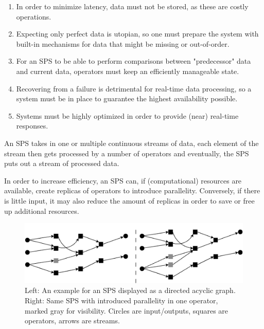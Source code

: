         \begin{enumerate}
            \item {} 
                In order to minimize latency, data must not be stored, as these are costly operations.
            \item {} 
                Expecting only perfect data is utopian, so one must prepare the system with built-in mechanisms for data that might be missing or out-of-order.
            \item {} 
                For an SPS to be able to perform comparisons between "predecessor" data and current data, operators must keep an efficiently manageable state.
            \item {} 
                Recovering from a failure is detrimental for real-time data processing, so a system must be in place to guarantee the highest availability possible.
            \item {} Systems must be highly optimized in order to provide (near) real-time responses.
        \end{enumerate}
        An SPS takes in one or multiple continuous streams of data, each element of the stream then gets processed by a number of operators and eventually, 
        the SPS puts out a stream of processed data.
    
        In order to increase efficiency, an SPS can, if (computational) resources are available, create replicas of operators to introduce parallelity. 
        Conversely, if there is little input, it may also reduce the amount of replicas in order to save or free up additional resources.
        \begin{figure}[htb]
        \centering
        \includegraphics[width=1.0\textwidth]{Bilder/sps_parallel_normal.png}
        \caption{
                Left: An example for an SPS displayed as a directed acyclic graph. 
                Right: Same SPS with introduced parallelity in one operator, marked gray for visibility. 
                Circles are input/outputs, squares are operators, arrows are streams.
                }
        \label{fig:sps_parallel_normal}
        \end{figure}



